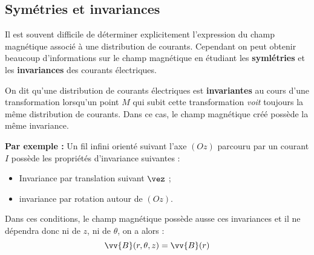 \documentclass{cours}
\begin{document}
\subsection{Symétries et invariances}%
\label{sub:symetries_et_invariances}
Il est souvent difficile de déterminer explicitement l'expression du champ magnétique associé à une distribution de courants. Cependant on peut obtenir beaucoup d'informations sur le champ magnétique en étudiant les \textbf{symlétries} et les \textbf{invariances} des courants électriques.

On dit qu'une distribution de courants électriques est \textbf{invariantes} au cours d'une transformation lorsqu'un point $M$ qui subit cette transformation \textit{voit} toujours la même distribution de courants. Dans ce cas, le champ magnétique créé possède la même invariance.

\textbf{Par exemple :} Un fil infini orienté suivant l'axe $(Oz)$ parcouru par un courant $I$ possède les propriétés d'invariance suivantes :
\begin{itemize}
  \item Invariance par translation suivant $\vez$ ;
  \item invariance par rotation autour de $(Oz)$. 
\end{itemize}

\begin{center}
\end{center}

Dans ces conditions, le champ magnétique possède ausse ces invariances et il ne dépendra donc ni de $z$, ni de $\theta$, on a alors :
  \begin{equation}
    \vv{B}(r, \theta, z) = \vv{B}(r)
  \end{equation}
\end{document}
